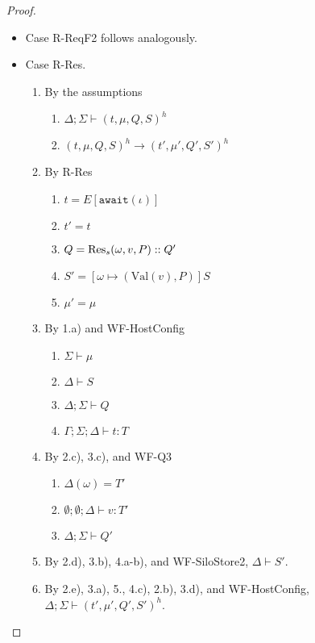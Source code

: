 \begin{proof}
\begin{itemize}
\item Case R-ReqF2 follows analogously.

\item Case R-Res.
\begin{enumerate}
\item By the assumptions
  \begin{enumerate}[label=(\alph*)]
  \item $\Delta ; \Sigma \vdash (t, \mu, Q, S)^h$
  \item $(t, \mu, Q, S)^h \longrightarrow (t', \mu', Q', S')^h$
  \end{enumerate}
\item By R-Res
  \begin{enumerate}[label=(\alph*)]
  \item $t = E[\texttt{await}(\iota)]$
  \item $t' = t$
  \item $Q = {\textrm{Res}_s(\omega, v, P)} :: Q'$
  \item $S' = [\omega \mapsto (\text{Val}(v), P)]S$
  \item $\mu' = \mu$
  \end{enumerate}
\item By 1.a) and WF-HostConfig
  \begin{enumerate}[label=(\alph*)]
  \item $\Sigma \vdash \mu$
  \item $\Delta \vdash S$
  \item $\Delta ; \Sigma \vdash Q$
  \item $\Gamma ; \Sigma ; \Delta \vdash t : T$
  \end{enumerate}
\item By 2.c), 3.c), and WF-Q3
  \begin{enumerate}[label=(\alph*)]
  \item $\Delta(\omega) = T'$
  \item $\emptyset ; \emptyset ; \Delta \vdash v : T'$
  \item $\Delta ; \Sigma \vdash Q'$
  \end{enumerate}
\item By 2.d), 3.b), 4.a-b), and WF-SiloStore2, $\Delta \vdash S'$.
\item By 2.e), 3.a), 5., 4.c), 2.b), 3.d), and WF-HostConfig, $\Delta ; \Sigma \vdash (t', \mu', Q', S')^h$.
\end{enumerate}


\end{itemize}
\end{proof}
